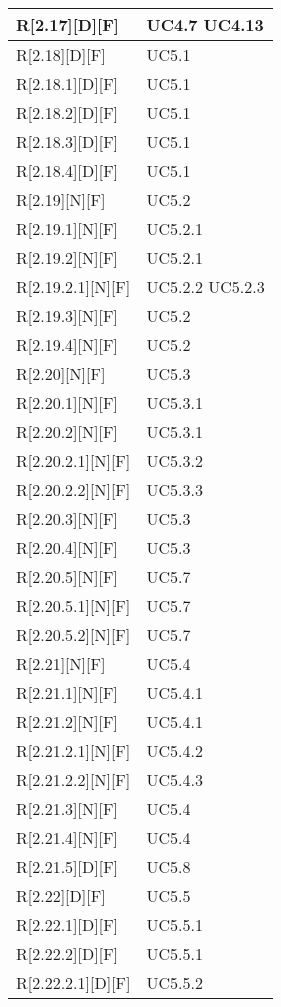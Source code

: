 \begin{longtable}{X | X}
\hline
R[2.17][D][F] & UC4.7 \newline UC4.13 \\
\hline
R[2.18][D][F] & UC5.1 \\
\hline
R[2.18.1][D][F] & UC5.1 \\
\hline
R[2.18.2][D][F] & UC5.1 \\
\hline
R[2.18.3][D][F] & UC5.1 \\
\hline
R[2.18.4][D][F] & UC5.1 \\
\hline
R[2.19][N][F] & UC5.2 \\
\hline
R[2.19.1][N][F] & UC5.2.1 \\
\hline
R[2.19.2][N][F] & UC5.2.1 \\
\hline
R[2.19.2.1][N][F] & UC5.2.2 \newline UC5.2.3 \\
\hline
R[2.19.3][N][F] & UC5.2 \\
\hline
R[2.19.4][N][F] & UC5.2 \\
\hline
R[2.20][N][F] & UC5.3 \\
\hline
R[2.20.1][N][F] & UC5.3.1 \\
\hline
R[2.20.2][N][F] & UC5.3.1 \\
\hline
R[2.20.2.1][N][F] & UC5.3.2 \\
\hline
R[2.20.2.2][N][F] & UC5.3.3 \\
\hline
R[2.20.3][N][F] & UC5.3 \\
\hline
R[2.20.4][N][F] & UC5.3 \\
\hline
R[2.20.5][N][F] & UC5.7 \\
\hline
R[2.20.5.1][N][F] & UC5.7 \\
\hline
R[2.20.5.2][N][F] & UC5.7 \\
\hline
R[2.21][N][F] & UC5.4 \\
\hline
R[2.21.1][N][F] & UC5.4.1 \\
\hline
R[2.21.2][N][F] & UC5.4.1 \\
\hline
R[2.21.2.1][N][F] & UC5.4.2 \\
\hline
R[2.21.2.2][N][F] & UC5.4.3 \\
\hline
R[2.21.3][N][F] & UC5.4 \\
\hline
R[2.21.4][N][F] & UC5.4 \\
\hline
R[2.21.5][D][F] & UC5.8 \\
\hline
R[2.22][D][F] & UC5.5 \\
\hline
R[2.22.1][D][F] & UC5.5.1 \\
\hline
R[2.22.2][D][F] & UC5.5.1 \\
\hline
R[2.22.2.1][D][F] & UC5.5.2 \\

\end{longtable}
